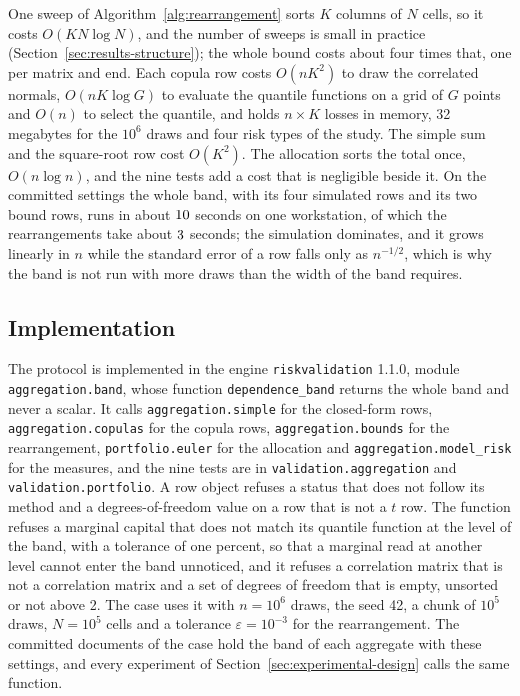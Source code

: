 One sweep of Algorithm~\ref{alg:rearrangement} sorts $K$ columns of $N$ cells, so it costs $O(KN\log N)$, and the number of sweeps
is small in practice (Section~\ref{sec:results-structure}); the whole bound costs about four times that, one per matrix and end.
Each copula row costs $O(nK^2)$ to draw the correlated normals, $O(nK\log G)$ to evaluate the quantile functions on a grid of
$G$ points and $O(n)$ to select the quantile, and holds $n\times K$ losses in memory, 32 megabytes for the $10^6$ draws and four
risk types of the study. The simple sum and the square-root row cost $O(K^2)$. The allocation sorts the total once, $O(n\log n)$, and the nine tests add a cost that is negligible beside it. On the
committed settings the whole band, with its four simulated rows and its two bound rows, runs in about $10$ seconds on one
workstation, of which the rearrangements take about $3$ seconds; the simulation dominates, and it grows linearly in $n$ while the
standard error of a row falls only as $n^{-1/2}$, which is why the band is not run with more draws than the width of the band
requires.

\subsection{Implementation}
\label{sec:method-implementation}

The protocol is implemented in the engine \texttt{riskvalidation} 1.1.0, module \texttt{aggregation.band}, whose function
\texttt{dependence\_band} returns the whole band and never a scalar. It calls \texttt{aggregation.simple} for the closed-form rows,
\texttt{aggregation.copulas} for the copula rows, \texttt{aggregation.bounds} for the rearrangement, \texttt{portfolio.euler} for
the allocation and \texttt{aggregation.model\_risk} for the measures, and the nine tests are in \texttt{validation.aggregation}
and \texttt{validation.portfolio}. A row object refuses a status that does not follow its method and a degrees-of-freedom value
on a row that is not a $t$ row. The function refuses a marginal capital that does not match its quantile function at the level of
the band, with a tolerance of one percent, so that a marginal read at another level cannot enter the band unnoticed, and it
refuses a correlation matrix that is not a correlation matrix and a set of degrees of freedom that is empty, unsorted or not
above 2. The case uses it with $n=10^6$ draws, the seed 42, a chunk of $10^5$ draws, $N=10^5$ cells and a tolerance
$\varepsilon=10^{-3}$ for the rearrangement. The committed documents of the case hold the band of each aggregate with these
settings, and every experiment of Section~\ref{sec:experimental-design} calls the same function.

